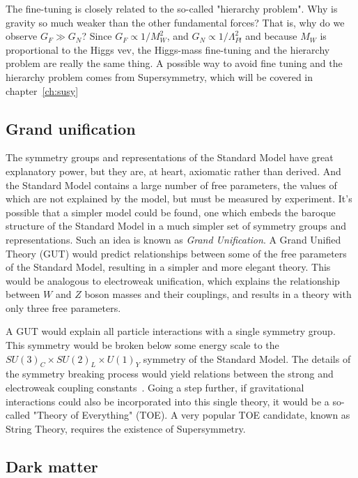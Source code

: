 The fine-tuning is closely related to the so-called "hierarchy problem".
Why is gravity so much weaker than the other fundamental forces?
That is, why do we observe $G_F \gg G_N$?
Since $G_F \propto 1/{M_W^2}$, and $G_N \propto 1/\Lambda_{Pl}^2$ and because $M_W$ is proportional to the Higgs vev, the Higgs-mass fine-tuning and the hierarchy problem are really the same thing.
A possible way to avoid fine tuning and the hierarchy problem comes from Supersymmetry, which will be covered in chapter~\ref{ch:susy}

\subsection{Grand unification}\label{subsec:sm_unification}

The symmetry groups and representations of the Standard Model have great explanatory power, but they are, at heart, axiomatic rather than derived.
And the Standard Model contains a large number of free parameters, the values of which are not explained by the model, but must be measured by experiment.
It's possible that a simpler model could be found, one which embeds the baroque structure of the Standard Model in a much simpler set of symmetry groups and representations.
Such an idea is known as \textit{Grand Unification}.
A Grand Unified Theory (GUT) would predict relationships between some of the free parameters of the Standard Model, resulting in a simpler and more elegant theory.
This would be analogous to electroweak unification, which explains the relationship between $W$ and $Z$ boson masses and their couplings, and results in a theory with only three free parameters.

A GUT would explain all particle interactions with a single symmetry group.
This symmetry would be broken below some energy scale to the $SU(3)_C \times SU(2)_L \times U(1)_Y$ symmetry of the Standard Model.
The details of the symmetry breaking process would yield relations between the strong and electroweak coupling constants~\cite{sm-gut}.
Going a step further, if gravitational interactions could also be incorporated into this single theory, it would be a so-called "Theory of Everything" (TOE).
A very popular TOE candidate, known as String Theory, requires the existence of Supersymmetry.

\subsection{Dark matter}\label{subsec:sm_dark_matter}

